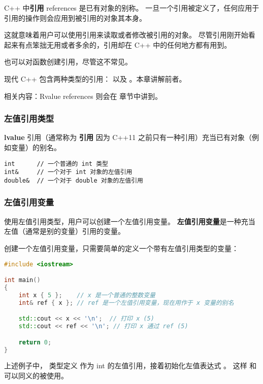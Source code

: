 \documentclass[../../LearnCpp.tex]{subfiles}
\begin{document}

C++ 中\textbf{引用} references 是已有对象的别称。
一旦一个引用被定义了，任何应用于引用的操作则会应用到被引用的对象其本身。

这就意味着用户可以使用引用来读取或者修改被引用的对象。
尽管引用刚开始看起来有点笨拙无用或者多余的，引用却在 C++ 中的任何地方都有用到。

也可以对函数创建引用，尽管这不常见。

现代 C++ 包含两种类型的引用： 以及 。本章讲解前者。

相关内容：Rvalue references 则会在  章节中讲到。

\subsubsection*{左值引用类型}

\textbf{lvalue} 引用（通常称为 \textbf{引用} 因为 C++11 之前只有一种引用）充当已有对象（例如变量）的别名。

\begin{lstlisting}
int      // 一个普通的 int 类型
int&     // 一个对于 int 对象的左值引用
double&  // 一个对于 double 对象的左值引用
\end{lstlisting}

\subsubsection*{左值引用变量}

使用左值引用类型，用户可以创建一个左值引用变量。
\textbf{左值引用变量}是一种充当左值（通常是别的变量）引用的变量。

创建一个左值引用变量，只需要简单的定义一个带有左值引用类型的变量：

\begin{lstlisting}[language=C++]
#include <iostream>

int main()
{
    int x { 5 };    // x 是一个普通的整数变量
    int& ref { x }; // ref 是一个左值引用变量，现在用作于 x 变量的别名

    std::cout << x << '\n';  // 打印 x (5)
    std::cout << ref << '\n'; // 打印 x 通过 ref (5)

    return 0;
}
\end{lstlisting}

上述例子中， 类型定义  作为 int 的左值引用，接着初始化左值表达式 。
这样  和  可以同义的被使用。
\end{document}
